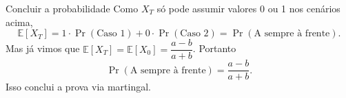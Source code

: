 \documentclass{beamer}
\begin{document}
\begin{frame}{Concluir a probabilidade}
  Como \(X_T\) só pode assumir valores 0 ou 1 nos cenários acima,
  \[
    \mathbb{E}[X_T]=1\cdot\Pr(\text{Caso 1}) + 0\cdot\Pr(\text{Caso 2}) = \Pr(\text{A sempre à frente}).
  \]
  Mas já vimos que \(\mathbb{E}[X_T]=\mathbb{E}[X_0]=\dfrac{a-b}{a+b}\). Portanto
  \[
    \Pr(\text{A sempre à frente})=\frac{a-b}{a+b}.
  \]
  Isso conclui a prova via martingal.
\end{frame}
\end{document}

